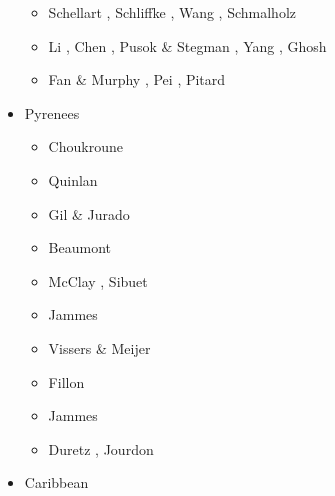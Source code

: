 \begin{itemize}
\begin{scriptsize}
\begin{itemize}
\item[\twothousandnineteen] Schellart \etal \cite{sccs19}, Schliffke \etal \cite{scvm19},
                            Wang \etal \cite{wazg19}, Schmalholz \etal \cite{scdh19}
\item[\twothousandtwenty] Li \etal \cite{livn20}, Chen \etal \cite{chlc20}, 
                          Pusok \& Stegman \cite{pust20}, Yang \etal \cite{yakl20}, 
                          Ghosh \etal \cite{ghbm20}
\item[\twothousandtwentyone] Fan \& Murphy \cite{famu21}, Pei \etal \cite{pels21},
                             Pitard \etal \cite{pirc21}
\end{itemize}
\end{scriptsize}

\item {Pyrenees} 

\begin{scriptsize}
\begin{itemize}
\item[\nineteenninetytwo] Choukroune \cite{chou92}
\item[\nineteenninetythree] Quinlan \etal \cite{qubh93}
\item[\nineteenninetyeight] Gil \& Jurado \cite{giju98}
\item[\twothousand] Beaumont \etal \cite{bemh00}
\item[\twothousandfour] McClay \etal \cite{mcmg04}, Sibuet \etal \cite{siss04}
\item[\twothousandten] Jammes \etal \cite{jaml10}
\item[\twothousandtwelve] Vissers \& Meijer \cite{vime12}
\item[\twothousandthirteen] Fillon \etal \cite{fihv13b}
\item[\twothousandfourteen] Jammes \etal \cite{jahm14}
\item[\twothousandnineteen] Duretz \etal \cite{dual19}, Jourdon \etal \cite{jolm19}
\end{itemize}
\end{scriptsize}

\item{Caribbean} 


\end{itemize}
